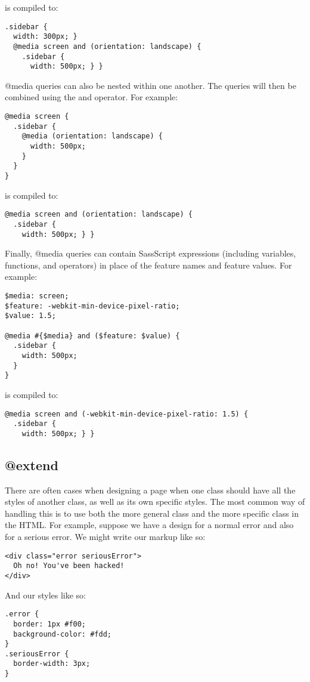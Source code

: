 \documentclass[9pt]{article}
\begin{document}
 is compiled to:
\begin{verbatim}
.sidebar {
  width: 300px; }
  @media screen and (orientation: landscape) {
    .sidebar {
      width: 500px; } }
\end{verbatim}


 @media queries can also be nested within one another. The queries will then be combined using the and operator. For example:
\begin{verbatim}
@media screen {
  .sidebar {
    @media (orientation: landscape) {
      width: 500px;
    }
  }
}
\end{verbatim}


 is compiled to:
\begin{verbatim}
@media screen and (orientation: landscape) {
  .sidebar {
    width: 500px; } }
\end{verbatim}


 Finally, @media queries can contain SassScript expressions (including variables, functions, and operators) in place of the feature names and feature values. For example:
\begin{verbatim}
$media: screen;
$feature: -webkit-min-device-pixel-ratio;
$value: 1.5;

@media #{$media} and ($feature: $value) {
  .sidebar {
    width: 500px;
  }
}
\end{verbatim}


 is compiled to:
\begin{verbatim}
@media screen and (-webkit-min-device-pixel-ratio: 1.5) {
  .sidebar {
    width: 500px; } }
\end{verbatim}
\subsection{@extend}


 There are often cases when designing a page when one class should have all the styles of another class, as well as its own specific styles. The most common way of handling this is to use both the more general class and the more specific class in the HTML. For example, suppose we have a design for a normal error and also for a serious error. We might write our markup like so:
\begin{verbatim}
<div class="error seriousError">
  Oh no! You've been hacked!
</div>
\end{verbatim}


 And our styles like so:
\begin{verbatim}
.error {
  border: 1px #f00;
  background-color: #fdd;
}
.seriousError {
  border-width: 3px;
}
\end{verbatim}
\end{document}
